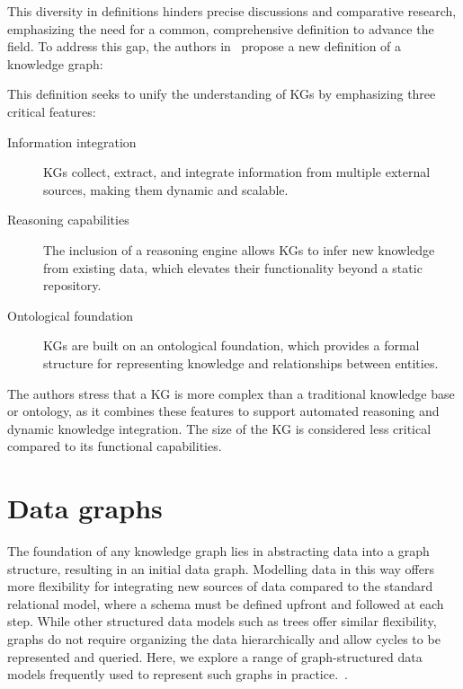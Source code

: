 This diversity in definitions hinders precise discussions and comparative research, emphasizing the need for a common, comprehensive definition to advance the field. To address this gap, the authors in~\cite{Ehrlinger2016TowardsAD} propose a new definition of a knowledge graph: 
\begin{center}
    \begin{quote}
    \end{quote}
\end{center}
This definition seeks to unify the understanding of KGs by emphasizing three critical features:
\begin{description}
    \item[Information integration] KGs collect, extract, and integrate information from multiple external sources, making them dynamic and scalable.
    \item[Reasoning capabilities] The inclusion of a reasoning engine allows KGs to infer new knowledge from existing data, which elevates their functionality beyond a static repository.
    \item[Ontological foundation] KGs are built on an ontological foundation, which provides a formal structure for representing knowledge and relationships between entities. 
\end{description}

The authors stress that a KG is more complex than a traditional knowledge base or ontology, as it combines these features to support automated reasoning and dynamic knowledge integration. The size of the KG is considered less critical compared to its functional capabilities.

\section{Data graphs}\label{data-graphs}
The foundation of any knowledge graph lies in abstracting data into a graph structure, resulting in an initial data graph. Modelling data in this way offers more flexibility for integrating new sources of data compared to the standard relational model, where a schema must be defined upfront and followed at each step. While other structured data models such as trees offer similar flexibility, graphs do not require organizing the data hierarchically and allow cycles to be represented and queried. Here, we explore a range of graph-structured data models frequently used to represent such graphs in practice.~\cite{Hogan2021KGs}. 

